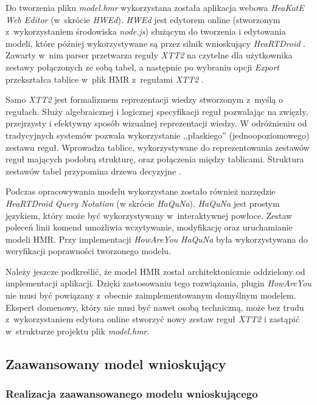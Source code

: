 Do tworzenia pliku \textit{model.hmr} wykorzystana została aplikacja webowa \textit{HeaKatE Web Editor} (w~skrócie \textit{HWEd}). \textit{HWEd} jest edytorem online (stworzonym z~wykorzystaniem środowiska \textit{node.js}) służącym do tworzenia i edytowania modeli, które później wykorzystywane są przez silnik wnioskujący \textit{HeaRTDroid} \cite{heartdroid}. Zawarty w~nim parser przetwarza reguły \textit{XTT2} na czytelne dla użytkownika zestawy połączonych ze sobą tabel, a następnie po wybraniu opcji \textit{Export} przekształca tablice w~plik HMR z~regułami \textit{XTT2} \cite{heartdroid}.

Samo \textit{XTT2} jest formalizmem reprezentacji wiedzy stworzonym z~myślą o regułach. Służy algebraicznej i logicznej specyfikacji reguł pozwalając na zwięzły, przejrzysty i efektywny sposób wizualnej reprezentacji wiedzy. W odróżnieniu od tradycyjnych systemów pozwala wykorzystanie ,,płaskiego'' (jednoopoziomowego) zestawu reguł. Wprowadza tablice, wykorzystywane do reprezentowania zestawów reguł mających podobrą strukturę, oraz połączenia między tablicami. Struktura zestawów tabel przypomina drzewa decyzyjne \cite{AiWikiHekate}.

Podczas opracowywania modelu wykorzystane zostało również narzędzie \textit{HeaRTDroid Query Notation} (w skrócie \textit{HaQuNa}). \textit{HaQuNa} jest prostym językiem, który może być wykorzystywany w~interaktywnej powłoce. Zestaw poleceń linii komend umożliwia wczytywanie, modyfikację oraz uruchamianie modeli HMR\cite{heartdroid}. Przy implementacji \textit{HowAreYou} \textit{HaQuNa} była wykorzystywana do weryfikacji poprawności tworzonego modelu.

Należy jeszcze podkreślić, że model HMR został architektonicznie oddzielony od implementacji aplikacji. Dzięki zastosowaniu tego rozwiązania, plugin \textit{HowAreYou} nie musi być powiązany z~obecnie zaimplementowanym domyślnym modelem. Ekspert domenowy, który nie musi być nawet osobą techniczną, może bez trudu z~wykorzystaniem edytora online stworzyć nowy zestaw reguł \textit{XTT2} i zastąpić w~strukturze projektu plik \textit{model.hmr}.

\subsection{Zaawansowany model wnioskujący}

\subsubsection{Realizacja zaawansowanego modelu wnioskującego}

